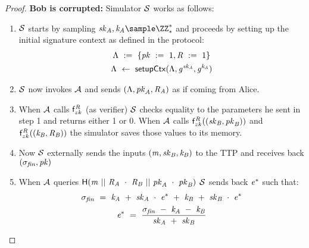 \begin{proof}
    \textbf{Bob is corrupted: } Simulator $\mathcal{S}$ works as follows:
    \begin{enumerate}
        \item $\mathcal{S}$ starts by sampling $\varSecKeyAlice, \varNonceAlice \sample \cnstIntegersPrimeWithoutZero{*}$ and proceeds by setting up the initial signature context as defined in the protocol:
        \begin{gather*}
            \Lambda ~:=~ \{ \mathit{pk} ~:=~ 1, \mathit{R} ~:=~ 1 \} \\
            \Lambda ~\leftarrow~ \mathsf{setupCtx}( \Lambda, \mathit{g}^{\mathit{sk}_{\mathit{A}}}, \mathit{g}^{\mathit{\mathit{k}_{\mathit{A}}}} ) \\
        \end{gather*}
        \item $\mathcal{S}$ now invokes $\mathcal{A}$ and sends $(\Lambda, \mathit{pk}_{\mathit{A}}, \mathit{R}_{\mathit{A}})$ as if coming from Alice.
        \item When $\mathcal{A}$ calls $\mathsf{f}^{\mathit{R}}_{zk}$ (as verifier) $\mathcal{S}$ checks equality to the parameters he sent in step 1 and returns either 1 or 0.
        When $\mathcal{A}$ calls $\mathsf{f}^{\mathit{R}}_{zk}((\mathit{sk}_{\mathit{B}}, \mathit{pk}_{\mathit{B}}))$ and $\mathsf{f}^{\mathit{R}}_{zk}((\mathit{\mathit{k}_{\mathit{B}}}, \mathit{R}_{\mathit{B}}))$ the simulator saves those values to its memory.
        \item Now $\mathcal{S}$ externally sends the inputs $(\mathit{m}, \mathit{sk}_{\mathit{B}}, \mathit{\mathit{k}_{\mathit{B}}})$ to the TTP and receives back $(\sigma_{\mathit{fin}}, \mathit{pk})$
        \item When $\mathcal{A}$ queries $\mathsf{H} (\mathit{m} ~||~ \mathit{R}_{\mathit{A}} ~\cdot~ \mathit{R}_{\mathit{B}} ~||~ \mathit{pk}_{\mathit{A}} ~\cdot~ \mathit{pk}_{\mathit{B}})$ $\mathcal{S}$ sends back $\mathit{e}^*$ such that:
        \begin{gather*}
            \sigma_{\mathit{fin}} ~=~ \mathit{\mathit{k}_{\mathit{A}}} ~+~ \mathit{sk}_{\mathit{A}} ~\cdot~ \mathit{e}^* ~+~ \mathit{\mathit{k}_{\mathit{B}}} ~+~ \mathit{sk}_{\mathit{B}} ~\cdot~ \mathit{e}^* \\
            \mathit{e}^* ~=~ \frac{\sigma_{\mathit{fin}} ~-~ \mathit{\mathit{k}_{\mathit{A}}} ~-~ \mathit{\mathit{k}_{\mathit{B}}}}{\mathit{sk}_{\mathit{A}} ~+~ \mathit{sk}_{\mathit{B}}}
        \end{gather*}
        
        

\end{enumerate}
\end{proof}
